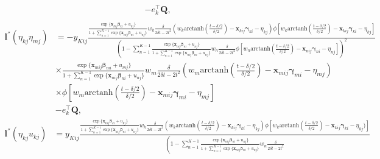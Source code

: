 \documentclass[12pt, %
               openright, %
               oneside, %
               a4paper, %
               chapter=TITLE, %
               section=TITLE, %
               brazil,
               english %
]{abntex2}
\begin{document}
\begin{apendicesenv}
\begin{align*}
 &- e_{k}^{\top} \bm{Q},\\
\end{align*}
\begin{align*}
 \bm{l}^{''}(\eta_{kj} \eta_{mj}) &= -
 y_{Kij}
 \frac{\frac{\exp\{\bm{x}_{kij} \bm{\beta}_{ki} + u_{kj}\}
            }{1 + \sum_{n = 1}^{K-1}
                  \exp\{\bm{x}_{nij} \bm{\beta}_{ni} + u_{nj}\}}
       w_{k}\frac{\delta}{2\delta t - 2t^{2}}
      (w_{k} \text{arctanh}\left(\frac{t-\delta/2}{\delta/2}\right)
       - \bm{x}_{kij}\bm{\gamma}_{ki} - \eta_{kj})
       \phi[w_{k} \text{arctanh}\left(\frac{t-\delta/2}{\delta/2}\right)
            - \bm{x}_{kij}\bm{\gamma}_{ki} - \eta_{kj}
           ]}{
 \left( 1 - \sum_{n = 1}^{K-1}
            \frac{\exp\{\bm{x}_{nij} \bm{\beta}_{ni} + u_{nj}\}
                 }{1 + \sum_{n = 1}^{K-1}
                       \exp\{\bm{x}_{nij} \bm{\beta}_{ni} + u_{nj}\}}
            w_{n}\frac{\delta}{2\delta t - 2t^{2}}
            \phi[w_{n}
            \text{arctanh}\left(\frac{t-\delta/2}{\delta/2}\right)
            - \bm{x}_{nij}\bm{\gamma}_{ni} - \eta_{nj}]
 \right)^{2}}\\
 &\times \frac{\exp\{\bm{x}_{mij} \bm{\beta}_{mi} + u_{mj}\}
              }{1 + \sum_{n = 1}^{K-1}
                    \exp\{\bm{x}_{nij} \bm{\beta}_{ni} + u_{nj}\}}
         w_{m}\frac{\delta}{2\delta t - 2t^{2}}
        (w_{m} \text{arctanh}\left(\frac{t-\delta/2}{\delta/2}\right)
         - \bm{x}_{mij}\bm{\gamma}_{mi} - \eta_{mj})\\
 &\times \phi[w_{m}
              \text{arctanh}\left(\frac{t-\delta/2}{\delta/2}\right)
              - \bm{x}_{mij}\bm{\gamma}_{mi} - \eta_{mj}
             ]\\
 &- e_{k}^{\top} \bm{Q},
\end{align*}
\begin{align*}
 \bm{l}^{''}(\eta_{kj} u_{kj}) &=
 y_{Kij}
 \frac{\frac{\exp\{\bm{x}_{kij} \bm{\beta}_{ki} + u_{kj}\}}{
             1 + \sum_{n = 1}^{K-1}
                 \exp\{\bm{x}_{nij} \bm{\beta}_{ni} + u_{nj}\}}
  w_{k}\frac{\delta}{2\delta t - 2t^{2}}
 (w_{k} \text{arctanh}\left(\frac{t-\delta/2}{\delta/2}\right)
  - \bm{x}_{kij}\bm{\gamma}_{ki} - \eta_{kj})
 \phi[w_{k} \text{arctanh}\left(\frac{t-\delta/2}{\delta/2}\right)
      - \bm{x}_{kij}\bm{\gamma}_{ki} - \eta_{kj})]}{
 \left( 1 - \sum_{n = 1}^{K-1}
            \frac{\exp\{\bm{x}_{nij} \bm{\beta}_{ni} + u_{nj}\}}{
                  1 + \sum_{n = 1}^{K-1}
                      \exp\{\bm{x}_{nij} \bm{\beta}_{ni} + u_{nj}\}}
            w_{n}\frac{\delta}{2\delta t - 2t^{2}}
}
\end{align*}
\end{apendicesenv}
\end{document}
